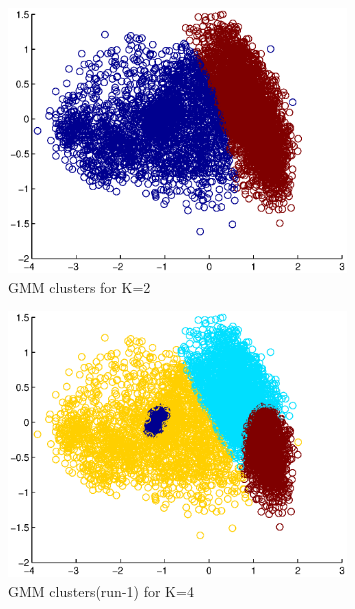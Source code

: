 \documentclass[a4paper]{article}
\begin{document}
\begin{enumerate}
		\begin{figure}[H]
			\begin{center}
				\includegraphics[width=0.8\textwidth]{GMM_K2.eps}
				\caption{GMM clusters for K=2}\label{fig:gmm_k2}
			\end{center}
		\end{figure}

		\begin{figure}[H]
			\begin{center}
				\includegraphics[width=0.8\textwidth]{GMM_K4.eps}
				\caption{GMM clusters(run-1) for K=4}\label{fig:gmm_k4}
			\end{center}
		\end{figure}


\end{enumerate}
\end{document}
